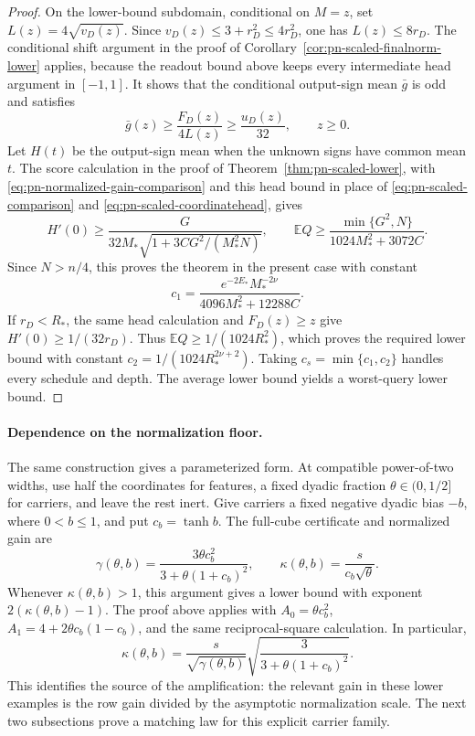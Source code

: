 \begin{proof}
On the lower-bound subdomain, conditional on $M=z$, set
$L(z)=4\sqrt{v_D(z)}$. Since $v_D(z)\le3+r_D^2\le4r_D^2$,
one has $L(z)\le8r_D$. The conditional shift argument in the proof
of Corollary~\ref{cor:pn-scaled-finalnorm-lower} applies, because the
readout bound above keeps every intermediate head argument in
$[-1,1]$. It shows that the conditional output-sign mean $\bar g$ is
odd and satisfies
\[
 \bar g(z)\ge\frac{F_D(z)}{4L(z)}\ge\frac{u_D(z)}{32},
 \qquad z\ge0.
\]
Let $H(t)$ be the output-sign mean when the unknown signs have common
mean $t$. The score calculation in the proof of
Theorem~\ref{thm:pn-scaled-lower}, with
\eqref{eq:pn-normalized-gain-comparison} and this head bound in place
of \eqref{eq:pn-scaled-comparison} and
\eqref{eq:pn-scaled-coordinatehead}, gives
\[
 H'(0)\ge\frac{G}{32M_*\sqrt{1+3CG^2/(M_*^2N)}},
 \qquad
 \mathbb EQ\ge
 \frac{\min\{G^2,N\}}{1024M_*^2+3072C}.
\]
Since $N>n/4$, this proves the theorem in the present case with
constant
\[
 c_1=\frac{e^{-2E_*}M_*^{-2\nu}}
                 {4096M_*^2+12288C}.
\]
If $r_D<R_*$, the same head calculation and $F_D(z)\ge z$ give
$H'(0)\ge1/(32r_D)$. Thus
$\mathbb EQ\ge1/(1024R_*^2)$, which proves the required lower
bound with constant $c_2=1/(1024R_*^{2\nu+2})$.
Taking $c_s=\min\{c_1,c_2\}$ handles every schedule and depth.
The average lower bound yields a worst-query lower bound.
\end{proof}

\paragraph{Dependence on the normalization floor.}
The same construction gives a parameterized form. At compatible
power-of-two widths, use half the coordinates for features, a fixed
dyadic fraction $\theta\in(0,1/2]$ for carriers, and leave the rest
inert. Give carriers a fixed negative dyadic bias $-b$, where
$0<b\le1$, and put $c_b=\tanh b$. The full-cube certificate and
normalized gain are
\[
 \gamma(\theta,b)=
 \frac{3\theta c_b^2}{3+\theta(1+c_b)^2},\qquad
 \kappa(\theta,b)=\frac{s}{c_b\sqrt\theta}.
\]
Whenever $\kappa(\theta,b)>1$, this argument gives a lower bound
with exponent $2(\kappa(\theta,b)-1)$. The proof above applies with
$A_0=\theta c_b^2$,
$A_1=4+2\theta c_b(1-c_b)$, and the same reciprocal-square
calculation. In particular,
\[
 \kappa(\theta,b)
 =\frac{s}{\sqrt{\gamma(\theta,b)}}
   \sqrt{\frac3{3+\theta(1+c_b)^2}}.
\]
This identifies the source of the amplification: the relevant
gain in these lower examples is the row gain divided by the
asymptotic normalization scale. The next two subsections prove a
matching law for this explicit carrier family.
